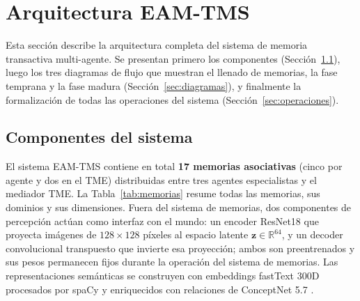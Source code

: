 \section{Arquitectura EAM-TMS}
\label{sec:arquitectura}

Esta sección describe la arquitectura completa del sistema de memoria transactiva
multi-agente.
Se presentan primero los componentes (Sección~\ref{sec:componentes}), luego los tres
diagramas de flujo que muestran el llenado de memorias, la fase temprana y la fase
madura (Sección~\ref{sec:diagramas}), y finalmente la formalización de todas las
operaciones del sistema (Sección~\ref{sec:operaciones}).

\subsection{Componentes del sistema}
\label{sec:componentes}

El sistema EAM-TMS contiene en total \textbf{17 memorias asociativas} (cinco por agente
y dos en el TME) distribuidas entre tres agentes especialistas y el mediador TME.
La Tabla~\ref{tab:memorias} resume todas las memorias, sus dominios y sus dimensiones.
Fuera del sistema de memorias, dos componentes de percepción actúan como interfaz con
el mundo: un encoder ResNet18 \cite{he2016resnet} que proyecta imágenes de $128\times128$
píxeles al espacio latente $\mathbf{z} \in \mathbb{R}^{64}$, y un decoder convolucional
transpuesto que invierte esa proyección; ambos son preentrenados y sus pesos permanecen
fijos durante la operación del sistema de memorias.
Las representaciones semánticas se construyen con embeddings fastText 300D
\cite{bojanowski2017fasttext} procesados por spaCy \cite{honnibal2020spacy} y
enriquecidos con relaciones de ConceptNet 5.7 \cite{speer2017conceptnet}.


